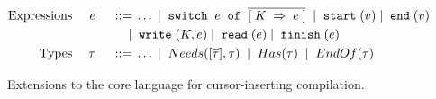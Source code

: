 
\begin{figure*}
  \begin{displaymath}
    \begin{aligned}
      \textup{Expressions} && \; {e} \; && 
     \; ::= \; & \ldots \; | \; \; \texttt{switch} \;{}\; e\; \; \texttt{of} \;\; \overline{[{\; {K} \;} \Rightarrow {\; {e} \;}]} \; 
     \; | \; \; \texttt{start} \;(v) \; | \; \; \texttt{end} \;(v)
      \\
      && && \; | \; & \; \texttt{write} \;(K,e) \; | \; \; \texttt{read} \;(e) \; | \;
      \; \texttt{finish} \;(e) \\      
      \textup{Types} && \; {\tau} \; && \; ::= \; & \ldots \; | \; \; Needs([\overline{\tau}],\tau) \; \; | \; \; Has(\tau) \; 
\; | \; \; EndOf(\tau) \; \\
    \end{aligned}
  \end{displaymath}
  \caption{Extensions to the core language for cursor-inserting compilation.}
  \label{fig:target}
\end{figure*}
